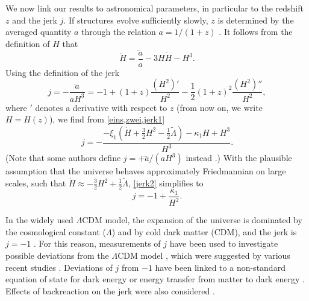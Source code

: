 \documentclass[aps,prl,11pt,nofootinbib]{revtex4-1}
\begin{document}
We now link our results to astronomical parameters, in particular to the redshift $z$ and the jerk $j$. If structures evolve sufficiently slowly, $z$ is determined by the averaged quantity $a$ through the relation $a=1/(1+z)$ \cite{HeinesenB2020}. It follows from the definition of $H$ that 
\begin{equation}
\ddot{H} = \frac{\dddot{a}}{a} -3 H \dot{H} - H^3.
\label{zwei}
\end{equation}
Using the definition of the jerk \cite{MukherjeeB2016}
\begin{equation}
j=-\frac{\dddot{a}}{aH^3}=-1 +(1+z)\frac{(H^2)'}{H^2}-\frac{1}{2}(1+z)^2\frac{(H^2)''}{H^2}, 
\label{jerk1}
\end{equation}
where $'$ denotes a derivative with respect to $z$ (from now on, we write $H=H(z)$), we find from \cref{eins,zwei,jerk1} 
\begin{equation}
j=-\frac{-\xi_1 (\dot{H}+ \frac{3}{2}H^2 - \frac{1}{2}\tilde{\Lambda})- \kappa_1 H + H^3}{H^3}.
\label{jerk2}
\end{equation}
(Note that some authors define $j=+\dddot{a}/(aH^3)$ instead \cite{Visser2004}.) With the plausible assumption that the universe behaves approximately Friedmannian on large scales, such that $\dot{H}\approx - \frac{3}{2}H^2 + \frac{1}{2}\tilde{\Lambda}$, \cref{jerk2} simplifies to
\begin{equation}
j= -1 + \frac{\kappa_1}{H^2}.
\label{jerk3} 
\end{equation}

In the widely used $\Lambda${\sc CDM} model, the expansion of the universe is dominated by the cosmological constant ($\Lambda$) and by cold dark matter ({\sc CDM}), and the jerk is $j=-1$ \cite{MukherjeeB2016}. For this reason, measurements of $j$ have been used to investigate possible deviations from the $\Lambda$CDM model \cite{LussoEtAl2019,ZhaiZZLZ2013,MukherjeeB2021}, which were suggested by various recent studies \cite{LussoEtAl2019,RisalitiL2019}. 
Deviations of $j$ from $-1$ have been linked to a non-standard equation of state for dark energy \cite{MukherjeeB2016} or energy transfer from matter to dark energy \cite{PerezSW2021}. Effects of backreaction on the jerk were also considered \cite{CarvalhoB2016,Bochner2013,Bochner2012}. 
\end{document}
